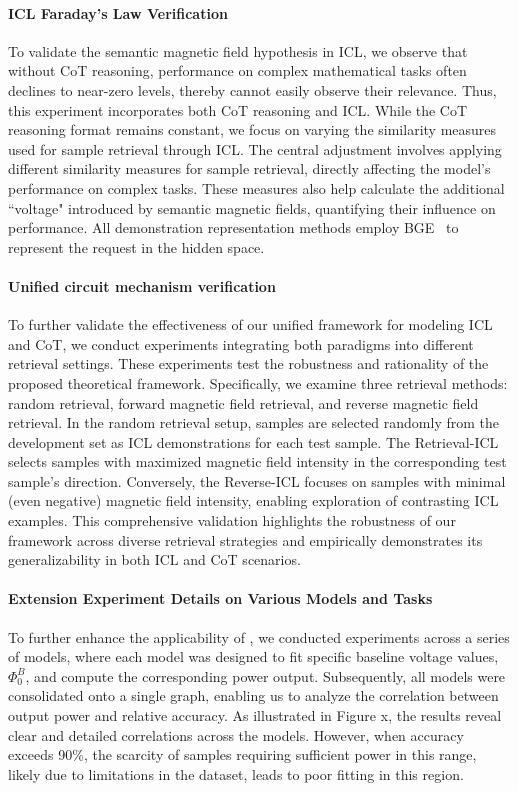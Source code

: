 \paragraph{ICL Faraday's Law Verification}
To validate the semantic magnetic field hypothesis in ICL, we observe that without CoT reasoning, performance on complex mathematical tasks often declines to near-zero levels, thereby cannot easily observe their relevance. Thus, this experiment incorporates both CoT reasoning and ICL. While the CoT reasoning format remains constant, we focus on varying the similarity measures used for sample retrieval through ICL.
The central adjustment involves applying different similarity measures for sample retrieval, directly affecting the model's performance on complex tasks. These measures also help calculate the additional ``voltage" introduced by semantic magnetic fields, quantifying their influence on performance. All demonstration representation methods employ BGE~\cite{chen2024bge} to represent the request in the hidden space.

\paragraph{Unified circuit mechanism verification}
To further validate the effectiveness of our unified framework for modeling ICL and CoT, we conduct experiments integrating both paradigms into different retrieval settings. These experiments test the robustness and rationality of the proposed theoretical framework. Specifically, we examine three retrieval methods: random retrieval, forward magnetic field retrieval, and reverse magnetic field retrieval.
In the random retrieval setup, samples are selected randomly from the development set as ICL demonstrations for each test sample. The Retrieval-ICL selects samples with maximized magnetic field intensity in the corresponding test sample's direction. Conversely, the Reverse-ICL focuses on samples with minimal (even negative) magnetic field intensity, enabling exploration of contrasting ICL examples.
This comprehensive validation highlights the robustness of our framework across diverse retrieval strategies and empirically demonstrates its generalizability in both ICL and CoT scenarios.

\paragraph{Extension Experiment Details on Various Models and Tasks}
To further enhance the applicability of \modelname{}, we conducted experiments across a series of models, where each model was designed to fit specific baseline voltage values, $\Phi^B_0$, and compute the corresponding power output. Subsequently, all models were consolidated onto a single graph, enabling us to analyze the correlation between output power and relative accuracy. As illustrated in Figure x, the results reveal clear and detailed correlations across the models. However, when accuracy exceeds 90\%, the scarcity of samples requiring sufficient power in this range, likely due to limitations in the dataset, leads to poor fitting in this region.

